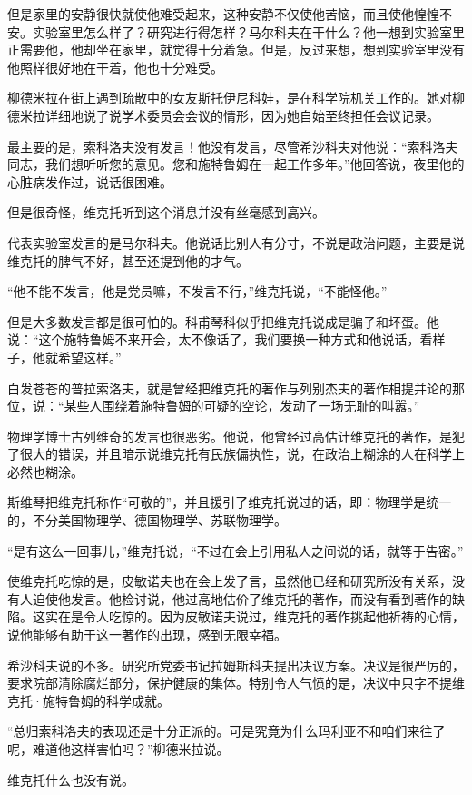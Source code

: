 但是家里的安静很快就使他难受起来，这种安静不仅使他苦恼，而且使他惶惶不安。实验室里怎么样了？研究进行得怎样？马尔科夫在干什么？他一想到实验室里正需要他，他却坐在家里，就觉得十分着急。但是，反过来想，想到实验室里没有他照样很好地在干着，他也十分难受。

柳德米拉在街上遇到疏散中的女友斯托伊尼科娃，是在科学院机关工作的。她对柳德米拉详细地说了说学术委员会会议的情形，因为她自始至终担任会议记录。

最主要的是，索科洛夫没有发言！他没有发言，尽管希沙科夫对他说：“索科洛夫同志，我们想听听您的意见。您和施特鲁姆在一起工作多年。”他回答说，夜里他的心脏病发作过，说话很困难。

但是很奇怪，维克托听到这个消息并没有丝毫感到高兴。

代表实验室发言的是马尔科夫。他说话比别人有分寸，不说是政治问题，主要是说维克托的脾气不好，甚至还提到他的才气。

“他不能不发言，他是党员嘛，不发言不行，”维克托说，“不能怪他。”

但是大多数发言都是很可怕的。科甫琴科似乎把维克托说成是骗子和坏蛋。他说：“这个施特鲁姆不来开会，太不像话了，我们要换一种方式和他说话，看样子，他就希望这样。”

白发苍苍的普拉索洛夫，就是曾经把维克托的著作与列别杰夫的著作相提并论的那位，说：“某些人围绕着施特鲁姆的可疑的空论，发动了一场无耻的叫嚣。”

物理学博士古列维奇的发言也很恶劣。他说，他曾经过高估计维克托的著作，是犯了很大的错误，并且暗示说维克托有民族偏执性，说，在政治上糊涂的人在科学上必然也糊涂。

斯维琴把维克托称作“可敬的”，并且援引了维克托说过的话，即：物理学是统一的，不分美国物理学、德国物理学、苏联物理学。

“是有这么一回事儿，”维克托说，“不过在会上引用私人之间说的话，就等于告密。”

使维克托吃惊的是，皮敏诺夫也在会上发了言，虽然他已经和研究所没有关系，没有人迫使他发言。他检讨说，他过高地估价了维克托的著作，而没有看到著作的缺陷。这实在是令人吃惊的。因为皮敏诺夫说过，维克托的著作挑起他祈祷的心情，说他能够有助于这一著作的出现，感到无限幸福。

希沙科夫说的不多。研究所党委书记拉姆斯科夫提出决议方案。决议是很严厉的，要求院部清除腐烂部分，保护健康的集体。特别令人气愤的是，决议中只字不提维克托·施特鲁姆的科学成就。

“总归索科洛夫的表现还是十分正派的。可是究竟为什么玛利亚不和咱们来往了呢，难道他这样害怕吗？”柳德米拉说。

维克托什么也没有说。

